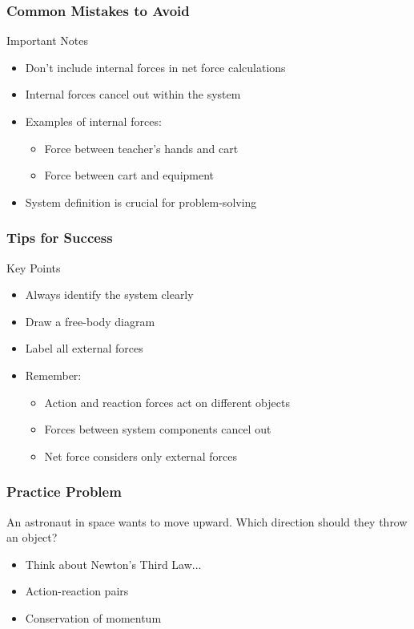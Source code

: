 \documentclass{beamer}
\begin{document}
\begin{frame}
\frametitle{Common Mistakes to Avoid}
\begin{alertblock}{Important Notes}
\begin{itemize}
    \item Don't include internal forces in net force calculations
    \pause
    \item Internal forces cancel out within the system
    \pause
    \item Examples of internal forces:
    \pause
    \begin{itemize}
        \item Force between teacher's hands and cart
        \item Force between cart and equipment
    \end{itemize}
    \pause
    \item System definition is crucial for problem-solving
\end{itemize}
\end{alertblock}
\end{frame}

\begin{frame}
\frametitle{Tips for Success}
\begin{block}{Key Points}
\begin{itemize}
    \item Always identify the system clearly
    \pause
    \item Draw a free-body diagram
    \pause
    \item Label all external forces
    \pause
    \item Remember:
    \pause
    \begin{itemize}
        \item Action and reaction forces act on different objects
        \item Forces between system components cancel out
        \item Net force considers only external forces
    \end{itemize}
\end{itemize}
\end{block}
\end{frame}

\begin{frame}
\frametitle{Practice Problem}
An astronaut in space wants to move upward. Which direction should they throw an object?
\pause
\begin{itemize}
    \item Think about Newton's Third Law...
    \item Action-reaction pairs
    \item Conservation of momentum
\end{itemize}
\end{frame}
\end{document}
